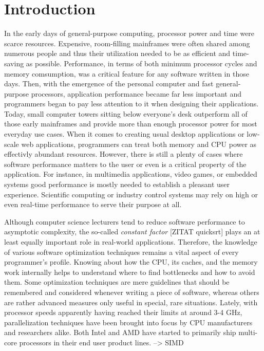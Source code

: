 \section{Introduction}
In the early days of general-purpose computing, processor power and time were scarce resources. Expensive, room-filling mainframes were often shared among numerous people and thus their utilization needed to be as efficient and time-saving as possible.   Performance, in terms of both minimum processor cycles and memory comsumption, was a critical feature for any software written in those days. Then, with the emergence of the personal computer and fast general-purpose processors, application performance became far less important and programmers began to pay less attention to it when designing their applications. Today, small computer towers sitting below everyone's desk outperform all of those early mainframes and provide more than enough processor power for most everyday use cases. When it comes to creating usual desktop applications or low-scale web applications, programmers can treat both memory and CPU power as effectivly abundant resources. However, there is still a plenty of cases where software performance matters to the user or even is a critical property of the application. For instance, in multimedia applications, video games, or embedded systems good performance is mostly needed to establish a pleasant user experience. Scientific computing or industry control systems may rely on high or even real-time performance to serve their purpose at all.

Although computer science lecturers tend to reduce software performance to asymptotic complexity, the so-called \emph{constant factor} [ZITAT quicksrt] plays an at least equally important role in real-world applications. Therefore, the knowledge of various software optimization techniques remains a vital aspect of every programmer's profile. Knowing about how the CPU, its caches, and the memory work internally helps to understand where to find bottlenecks and how to avoid them. Some optimization techniques are mere guidelines that should be remembered and considered whenever writing a piece of software, whereas others are rather advanced measures only useful in special, rare situations. Lately, with processor speeds apparently having reached their limits at around 3-4 GHz, parallelization techniques have been brought into focus by CPU manufacturers and researchers alike. Both Intel and AMD have started to primarily ship multi-core processors in their end user product lines. --> SIMD


